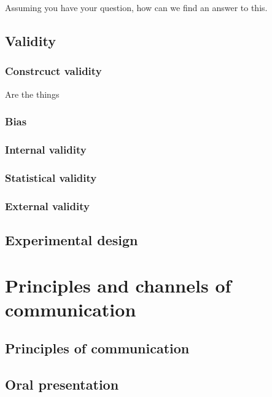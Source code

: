 \documentclass{tufte-book}
\begin{document}
Assuming you have your question, how can we find an answer to this.

\section{Validity}

\subsection{Constrcuct validity}

Are the things 

\subsection{Bias}


\citep{Ransohoff-Biasasthreat-2005}

\subsection{Internal validity}


\subsection{Statistical validity}


\subsection{External validity}


\section{Experimental design}



\chapter{Principles and channels of communication}


\section{Principles of communication}

\section{Oral presentation}
\end{document}
